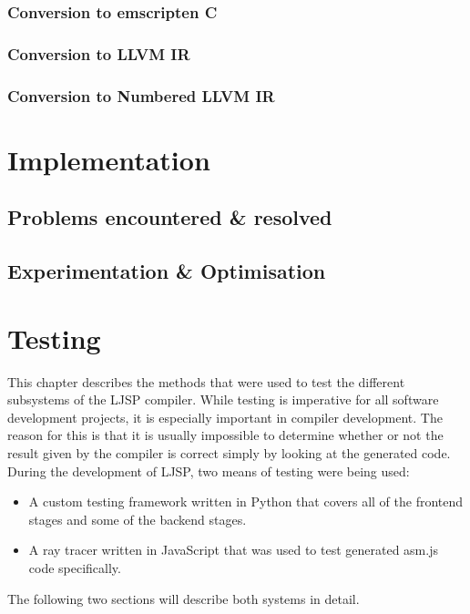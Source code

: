 \documentclass[11pt]{report}
\begin{document}
\subsection{Conversion to emscripten C}
\subsection{Conversion to LLVM IR}
\subsection{Conversion to Numbered LLVM IR}

\chapter{Implementation}
\section{Problems encountered \& resolved}
\section{Experimentation \& Optimisation}

\chapter{Testing}
This chapter describes the methods that were used to test the different subsystems of the LJSP compiler. While testing is imperative for all software development projects, it is especially important in compiler development. The reason for this is that it is usually impossible to determine whether or not the result given by the compiler is correct simply by looking at the generated code. \\

During the development of LJSP, two means of testing were being used:
\begin{itemize}
\item A custom testing framework written in Python that covers all of the frontend stages and some of the backend stages.
\item A ray tracer written in JavaScript that was used to test generated asm.js code specifically.
\end{itemize}
The following two sections will describe both systems in detail.
\end{document}
